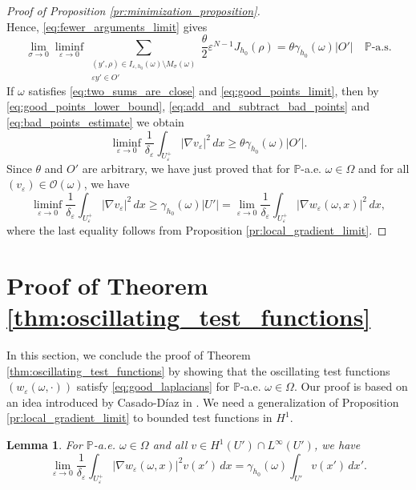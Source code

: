 \documentclass{article}
\numberwithin{equation}{section}
\newtheorem{lemma}[theorem]{Lemma}
\theoremstyle{definition}
\theoremstyle{remark}
\begin{document}
\begin{proof}[Proof of Proposition \ref{pr:minimization_proposition}]
\begin{equation}
    \end{equation}
    Hence, \eqref{eq:fewer_arguments_limit} gives
    \begin{equation} \label{eq:good_points_limit}
        \lim_{\sigma \to 0} \liminf_{\varepsilon \to 0} \sum \limits_{\substack{(y', \rho) \in I_{\varepsilon, h_0}(\omega) \setminus M_\sigma(\omega) \\ \varepsilon y' \in O'}} \frac{\theta}{2} \varepsilon^{N - 1} J_{h_0}(\rho) = \theta \gamma_{h_0}(\omega) |O'| \quad \mathbb{P}\text{-a.s.}
    \end{equation}
    If $\omega$ satisfies \eqref{eq:two_sums_are_close} and \eqref{eq:good_points_limit}, then by \eqref{eq:good_points_lower_bound}, \eqref{eq:add_and_subtract_bad_points} and \eqref{eq:bad_points_estimate} we obtain
    \[
    \liminf_{\varepsilon \to 0} \frac{1}{\delta_\varepsilon} \int_{U_\varepsilon^+} |\nabla v_\varepsilon|^2 \, dx \ge \theta \gamma_{h_0}(\omega) |O'|. 
    \]
    Since $\theta$ and $O'$ are arbitrary, we have just proved that for $\mathbb{P}$-a.e. $\omega \in \Omega$ and for all $(v_\varepsilon) \in \mathcal{O}(\omega)$, we have
    \[
    \liminf_{\varepsilon \to 0} \frac{1}{\delta_\varepsilon} \int_{U_\varepsilon^+} |\nabla v_\varepsilon|^2 \, dx \ge \gamma_{h_0}(\omega) |U'| = \lim_{\varepsilon \to 0} \frac{1}{\delta_\varepsilon} \int_{U_\varepsilon^+} |\nabla w_\varepsilon(\omega, x)|^2 \, dx,
    \]
    where the last equality follows from Proposition \ref{pr:local_gradient_limit}.
\end{proof}

\section{Proof of Theorem \ref{thm:oscillating_test_functions}} \label{sec:proof_of_main_theorem}

In this section, we conclude the proof of Theorem \ref{thm:oscillating_test_functions} by showing that the oscillating test functions $(w_\varepsilon(\omega, \cdot))$ satisfy \eqref{eq:good_laplacians} for $\mathbb{P}$-a.e. $\omega \in \Omega$. Our proof is based on an idea introduced by Casado-Díaz in \cite[Theorem 2.1]{CD}. We need a generalization of Proposition \ref{pr:local_gradient_limit} to bounded test functions in $H^1$.

\begin{lemma} \label{lm:extended_local_gradient}
    For $\mathbb{P}$-a.e. $\omega \in \Omega$ and all $v \in H^1(U') \cap L^\infty(U')$, we have
    \[
    \lim_{\varepsilon \to 0} \frac{1}{\delta_\varepsilon} \int_{U_\varepsilon^+} |\nabla w_\varepsilon(\omega, x)|^2 v(x') \, dx = \gamma_{h_0}(\omega) \int_{U'} v(x') \, dx'.
    \]
\end{lemma}
\end{document}
